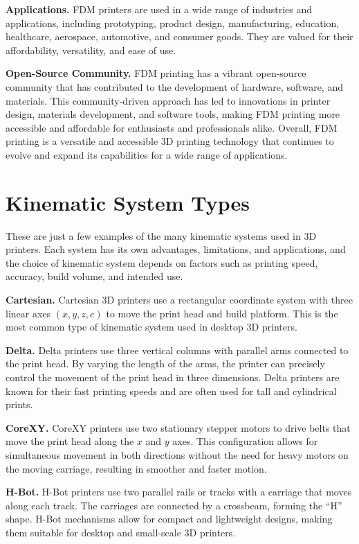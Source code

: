 \noindent\textbf{Applications.}
FDM printers are used in a wide range of industries and applications, including prototyping, product design, manufacturing, education, healthcare, aerospace, automotive, and consumer goods. They are valued for their affordability, versatility, and ease of use.

\noindent\textbf{Open-Source Community.}
FDM printing has a vibrant open-source community that has contributed to the development of hardware, software, and materials. This community-driven approach has led to innovations in printer design, materials development, and software tools, making FDM printing more accessible and affordable for enthusiasts and professionals alike.
Overall, FDM printing is a versatile and accessible 3D printing technology that continues to evolve and expand its capabilities for a wide range of applications.


\section{Kinematic System Types}

These are just a few examples of the many kinematic systems used in 3D printers.
Each system has its own advantages, limitations, and applications, and the choice of kinematic system depends on factors such as printing speed, accuracy, build volume, and intended use.

\noindent\textbf{Cartesian.}
Cartesian 3D printers use a rectangular coordinate system with three linear axes  $(x,y,z,e)$ to move the print head and build platform.
This is the most common type of kinematic system used in desktop 3D printers.

\noindent\textbf{Delta.}
Delta printers use three vertical columns with parallel arms connected to the print head. By varying the length of the arms, the printer can precisely control the movement of the print head in three dimensions.
Delta printers are known for their fast printing speeds and are often used for tall and cylindrical prints.

\noindent\textbf{CoreXY.}
CoreXY printers use two stationary stepper motors to drive belts that move the print head along the $x$ and $y$ axes.
This configuration allows for simultaneous movement in both directions without the need for heavy motors on the moving carriage, resulting in smoother and faster motion.

\noindent\textbf{H-Bot.}
H-Bot printers use two parallel rails or tracks with a carriage that moves along each track.
The carriages are connected by a crossbeam, forming the {\textquotedblleft}H{\textquotedblright} shape.
H-Bot mechanisms allow for compact and lightweight designs, making them suitable for desktop and small-scale 3D printers.

